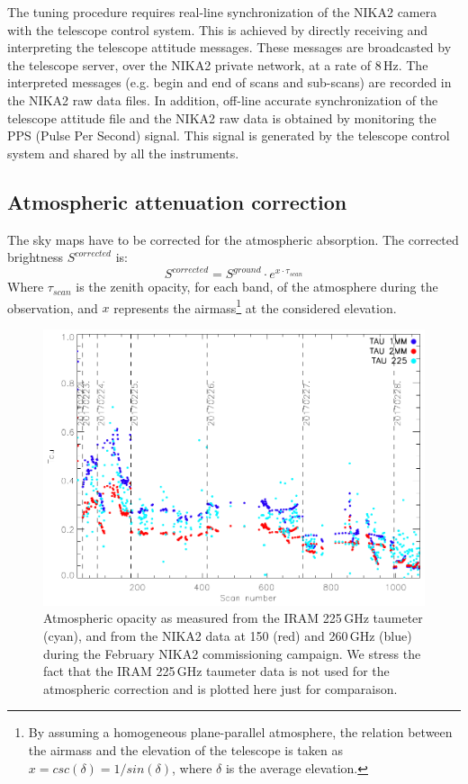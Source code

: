 \documentclass[]{aa} %
\begin{document}
The tuning procedure requires real-line synchronization of the NIKA2 camera with the telescope control system. This is achieved by directly receiving and interpreting the telescope attitude messages. These messages are broadcasted by the telescope server, over the NIKA2 private network, at a rate of 8\,Hz. The interpreted messages (e.g. begin and end of scans and sub-scans) are recorded in the NIKA2 raw data files. In addition, off-line accurate synchronization of the telescope attitude file and the NIKA2 raw data is obtained by monitoring the PPS (Pulse Per Second) signal. This signal is generated by the telescope control system and shared by all the instruments.


\subsection{Atmospheric attenuation correction}
\label{Atmospheric attenuation correction}


The sky maps have to be corrected for the atmospheric absorption. The corrected brightness $S^{corrected}$ is:
\begin{equation}\label{eq:opa}
S^{corrected} =  S^{ground} \cdot e^{ x \cdot \tau_{scan}}
\end{equation}
Where $\tau_{scan}$ is the zenith opacity, for each band, of the atmosphere during the
observation, and $x$ represents the airmass\footnote{By assuming a
  homogeneous plane-parallel atmosphere, the relation between the
  airmass and the elevation of the telescope is taken as $x =
  csc(\delta)=1/sin(\delta)$, where $\delta$ is the average
  elevation.} at the considered elevation.

\begin{figure}
\includegraphics[scale=0.55]{./opacity_evol_run22.pdf}
\caption{Atmospheric opacity as measured from the IRAM 225\,GHz taumeter (cyan), and from the NIKA2 data at 150 (red) and 260\,GHz (blue) during the February NIKA2 commissioning campaign.
 We stress the fact that the IRAM 225\,GHz taumeter data is not used for the atmospheric correction and is plotted here just for comparaison.
  \label{fig:taumeas}}
\end{figure}
\end{document}
